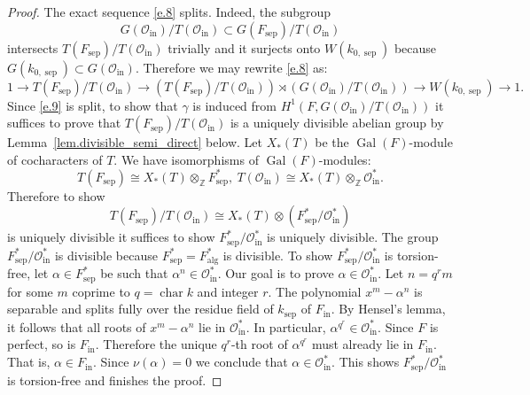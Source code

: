 \documentclass[12pt]{amsart}
\numberwithin{equation}{section}
\theoremstyle{definition}
\newcommand{\cO}{\mathcal{O}}
\newcommand{\bZ}{\mathbb{Z}}
\newcommand{\Gal}{\operatorname{Gal}}
\newcommand{\alg}{\operatorname{alg}}
\newcommand{\sep}{\operatorname{sep}}
\newcommand{\Char}{\operatorname{char}}
\newcommand{\ksep}{k_{\sep}}
\newcommand{\Falg}{F_{\alg}}
\newcommand{\oin}{\operatorname{in}}
\newcommand{\Oin}{\cO_{\oin}}
\newcommand{\Fin}{F_{\oin}}
\newcommand{\Fsep}{F_{\sep}}
\begin{document}
\begin{proof}
    The exact sequence \eqref{e.8} splits.
    Indeed, the subgroup $$G(\Oin)/T(\Oin) \subset G(\Fsep)/T(\Oin)$$ intersects $T(\Fsep)/T(\Oin)$ trivially and it surjects onto $W(k_{0,\sep})$ because $G(k_{0,\sep})\subset G(\Oin)$.  Therefore we may rewrite \eqref{e.8} as:
    \begin{equation}\label{e.9}
        1\to T(\Fsep)/T(\Oin) \to (T(\Fsep)/T(\Oin)) \rtimes (G(\Oin)/T(\Oin)) \to W(k_{0,\sep}) \to 1.
    \end{equation}
    Since \eqref{e.9} is split, to show that $\gamma$ is induced from $H^1(F,G(\Oin)/T(\Oin))$ it suffices to prove that $T(\Fsep)/T(\Oin)$ is a uniquely divisible abelian group  by Lemma~\ref{lem.divisible_semi_direct} below. Let $X_*(T)$ be the $\Gal(F)$-module of cocharacters of $T$. We have isomorphisms of $\Gal(F)$-modules:
    $$T(\Fsep) \cong X_*(T) \otimes_\bZ \Fsep^*, \ T(\Oin) \cong X_*(T) \otimes_\bZ \Oin^*.$$
    Therefore to show $$T(\Fsep)/T(\Oin) \cong X_*(T)\otimes (\Fsep^*/\Oin^*)$$ is uniquely divisible it suffices to show $ \Fsep^*/\Oin^*$ is uniquely divisible. The group $\Fsep^*/\Oin^*$ is divisible because $\Fsep^* = \Falg^*$ is divisible. To show $ \Fsep^*/\Oin^*$ is torsion-free,  let $\alpha \in \Fsep^*$ be such that $\alpha^n \in \Oin^*$. Our goal is to prove $\alpha\in \Oin^*$. Let $n = q^r m$ for some $m$ coprime to $q=\Char k$ and integer $r$. The polynomial $x^m - \alpha^{n}$ is separable and splits fully over the residue field of $\ksep$ of $\Fin$. By Hensel's lemma, it follows that all roots of $x^m - \alpha^{n}$ lie in $\Oin^*$. In particular, $\alpha^{q^r}\in \Oin^*$. Since $F$ is perfect,  so is $\Fin$. Therefore the unique $q^r$-th root of $\alpha^{q^r}$ must already lie in $\Fin$. That is, $\alpha \in \Fin$. Since $\nu(\alpha)=0$ we conclude that $\alpha \in \Oin^*$. This shows $\Fsep^*/\Oin^*$ is torsion-free and finishes the proof. 
\end{proof}
\end{document}

